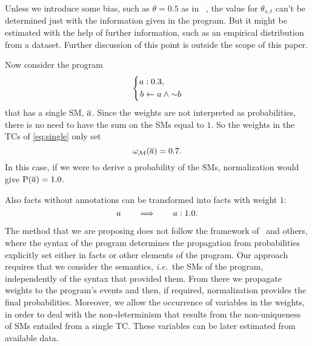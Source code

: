 \documentclass[x11names]{tlp}
\renewcommand{\cite}{\citep}
\begin{document}
Unless we introduce some bias, such as $\theta = 0.5$ as in \lpmln\ \cite{lee2016weighted}, the value for $\theta_{s,t}$ can't be determined just with the information given in the program. But it might be estimated with the help of further information, such as an empirical distribution from a dataset.
Further discussion of this point is outside the scope of this paper.
%

Now consider the program
\begin{equation}\label{eq:single}
	\left\{\begin{split}
		\weightfact{a & }{0.3},   %
		\\
		b & \clause a \wedge \naf b
	\end{split}
	\right.
\end{equation}
that has a single \ac{SM}, $\overline{a}$. Since the weights are not interpreted as probabilities, there is no need to have the sum on the \aclp{SM} equal to $1$. So the weights in the \acp{TC} of \cref{eq:single} only set
$$
\wgtM\at{\co{a}} = 0.7.
$$
In this case, if we were to derive a probability of the \acp{SM}, normalization would give $\pr{\co{a}} = 1.0$.

Also facts without annotations can be transformed into facts with weight $1$:
\begin{equation}
	a \qquad \Longrightarrow \qquad a:1.0. \label{eq:noannotation}
\end{equation}

The method that we are proposing does not follow the framework of~\cite{kifer1992theory} and others, where the syntax of the program determines the propagation from probabilities explicitly set either in facts or other elements of the program.
Our approach requires that we consider the semantics, \emph{i.e.}\ the \aclp{SM} of the program, independently of the syntax that provided them. From there we propagate weights to the program's events and then, if required, normalization provides the final probabilities.
Moreover, we allow the occurrence of variables in the weights, in order to deal with the non-determinism that results from the non-uniqueness of \acp{SM} entailed from a single \ac{TC}.
These variables can be later estimated from available data.%
\end{document}
